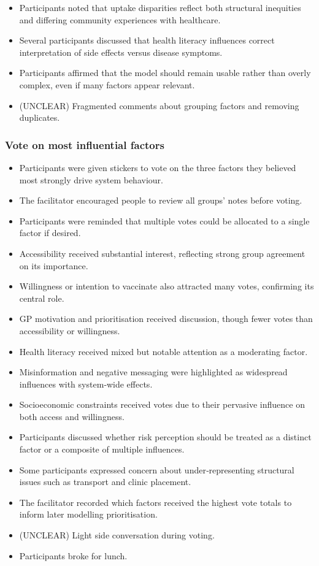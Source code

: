 \documentclass{article}
\begin{document}
\begin{itemize}
    \item Participants noted that uptake disparities reflect both structural inequities and differing community experiences with healthcare.
    \item Several participants discussed that health literacy influences correct interpretation of side effects versus disease symptoms.
    \item Participants affirmed that the model should remain usable rather than overly complex, even if many factors appear relevant.
    \item (UNCLEAR) Fragmented comments about grouping factors and removing duplicates.
\end{itemize}

\subsubsection{Vote on most influential factors}

\begin{itemize}
    \item Participants were given stickers to vote on the three factors they believed most strongly drive system behaviour.
    \item The facilitator encouraged people to review all groups’ notes before voting.
    \item Participants were reminded that multiple votes could be allocated to a single factor if desired.
    \item Accessibility received substantial interest, reflecting strong group agreement on its importance.
    \item Willingness or intention to vaccinate also attracted many votes, confirming its central role.
    \item GP motivation and prioritisation received discussion, though fewer votes than accessibility or willingness.
    \item Health literacy received mixed but notable attention as a moderating factor.
    \item Misinformation and negative messaging were highlighted as widespread influences with system‑wide effects.
    \item Socioeconomic constraints received votes due to their pervasive influence on both access and willingness.
    \item Participants discussed whether risk perception should be treated as a distinct factor or a composite of multiple influences.
    \item Some participants expressed concern about under‑representing structural issues such as transport and clinic placement.
    \item The facilitator recorded which factors received the highest vote totals to inform later modelling prioritisation.
    \item (UNCLEAR) Light side conversation during voting.
    \item Participants broke for lunch.
\end{itemize}
\end{document}

